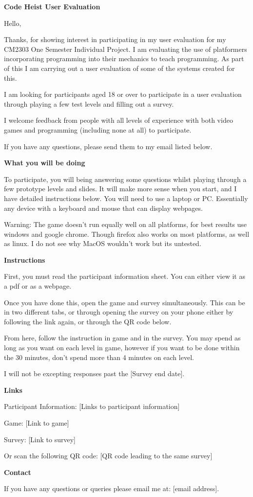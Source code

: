 \textbf{Code Heist User Evaluation}

Hello,

Thanks, for showing interest in participating in my user evaluation for my CM2303 One Semester Individual Project. I am evaluating the use of platformers incorporating programming into their mechanics to teach programming. As part of this I am carrying out a user evaluation of some of the systems created for this.

I am looking for participants aged 18 or over to participate in a user evaluation through playing a few test levels and filling out a survey.

I welcome feedback from people with all levels of experience with both video games and programming (including none at all) to participate.

If you have any questions, please send them to my email listed below.

\textbf{What you will be doing}

To participate, you will being answering some questions whilst playing through a few prototype levels and slides. It will make more sense when you start, and I have detailed instructions below. You will need to use a laptop or PC. Essentially any device with a keyboard and mouse that can display webpages.

Warning: The game doesn’t run equally well on all platforms, for best results use windows and google chrome. Though firefox also works on most platforms, as well as linux. I do not see why MacOS wouldn’t work but its untested.

\textbf{Instructions}

First, you must read the participant information sheet. You can either view it as a pdf or as a webpage.

Once you have done this, open the game and survey simultaneously. This can be in two different tabs, or through opening the survey on your phone either by following the link again, or through the QR code below.

From here, follow the instruction in game and in the survey. You may spend as long as you want on each level in game, however if you want to be done within the 30 minutes, don’t spend more than 4 minutes on each level.

I will not be excepting responses past the [Survey end date]. 

\textbf{Links}

    Participant Information:
        [Links to participant information]

    Game:
        [Link to game]

    Survey:
        [Link to survey]
        
        Or scan the following QR code:
        [QR code leading to the same survey]

\textbf{Contact}

If you have any questions or queries please email me at: [email address].
